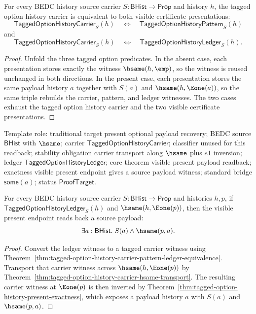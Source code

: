 \begin{theorem}
\label{thm:tagged-option-history-carrier-pattern-ledger-equivalence}
For every BEDC history source carrier $S:\mathsf{BHist}\to\mathsf{Prop}$ and history $h$, the tagged option history carrier is equivalent to both visible certificate presentations:
$$
\mathsf{TaggedOptionHistoryCarrier}_S(h)
\quad\Longleftrightarrow\quad
\mathsf{TaggedOptionHistoryPattern}_S(h)
$$
and
$$
\mathsf{TaggedOptionHistoryCarrier}_S(h)
\quad\Longleftrightarrow\quad
\mathsf{TaggedOptionHistoryLedger}_S(h).
$$
\end{theorem}
\begin{proof}
Unfold the three tagged option predicates. In the absent case, each presentation stores exactly the witness $\hsame(h,\emp)$, so the witness is reused unchanged in both directions. In the present case, each presentation stores the same payload history $a$ together with $S(a)$ and $\hsame(h,\Eone(a))$, so the same triple rebuilds the carrier, pattern, and ledger witnesses. The two cases exhaust the tagged option history carrier and the two visible certificate presentations.
\end{proof}

\begin{theorem}
\label{thm:tagged-option-ledger-present-payload-readback}
Template role: traditional target present optional payload recovery; BEDC source
$\mathsf{BHist}$ with $\hsame$; carrier
$\mathsf{TaggedOptionHistoryCarrier}$; classifier unused for this readback;
stability obligation carrier transport along $\hsame$ plus $e1$ inversion;
ledger $\mathsf{TaggedOptionHistoryLedger}$; core theorem visible present
payload readback; exactness visible present endpoint gives a source payload
witness; standard bridge $\mathsf{some}(a)$; status $\mathsf{ProofTarget}$.

For every BEDC history source carrier $S:\mathsf{BHist}\to\mathsf{Prop}$ and
histories $h,p$, if $\mathsf{TaggedOptionHistoryLedger}_S(h)$ and
$\hsame(h,\Eone(p))$, then the visible present endpoint reads back a source
payload:
$$
\exists a:\mathsf{BHist}.\; S(a)\land\hsame(p,a).
$$
\end{theorem}
\begin{proof}
Convert the ledger witness to a tagged carrier witness using
Theorem~\ref{thm:tagged-option-history-carrier-pattern-ledger-equivalence}.
Transport that carrier witness across $\hsame(h,\Eone(p))$ by
Theorem~\ref{thm:tagged-option-history-carrier-hsame-transport}. The resulting
carrier witness at $\Eone(p)$ is then inverted by
Theorem~\ref{thm:tagged-option-history-present-exactness}, which exposes a
payload history $a$ with $S(a)$ and $\hsame(p,a)$.
\end{proof}

